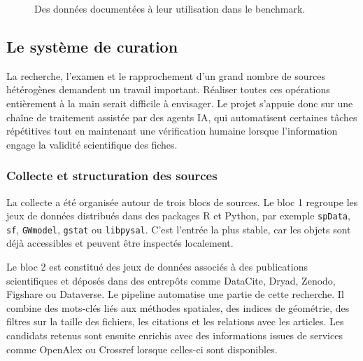 \documentclass[11pt,a4paper]{article}
\begin{document}
\begin{figure}[H]
\centering
{}
\caption{Des données documentées à leur utilisation dans le benchmark.}

\label{fig:chaine-methodologique}
\end{figure}


\subsection{Le système de curation}
La recherche, l'examen et le rapprochement d'un grand nombre de sources hétérogènes demandent un travail important. Réaliser toutes ces opérations entièrement à la main serait difficile à envisager. Le projet s'appuie donc sur une chaîne de traitement assistée par des agents IA, qui automatisent certaines tâches répétitives tout en maintenant une vérification humaine lorsque l'information engage la validité scientifique des fiches.

\subsubsection{Collecte et structuration des sources}

La collecte a été organisée autour de trois blocs de sources. Le bloc 1 regroupe les jeux de données distribués dans des packages R et Python, par exemple \texttt{spData}, \texttt{sf}, \texttt{GWmodel}, \texttt{gstat} ou \texttt{libpysal}. C'est l'entrée la plus stable, car les objets sont déjà accessibles et peuvent être inspectés localement.

Le bloc 2 est constitué des jeux de données associés à des publications scientifiques et déposés dans des entrepôts comme DataCite, Dryad, Zenodo, Figshare ou Dataverse. Le pipeline  automatise une partie de cette recherche. Il combine des mots-clés liés aux méthodes spatiales, des indices de géométrie, des filtres sur la taille des fichiers, les citations et les relations avec les articles. Les candidats retenus sont ensuite enrichis avec des informations issues de services comme OpenAlex ou Crossref lorsque celles-ci sont disponibles.
\end{document}
